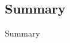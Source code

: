 \subsection{Summary}

\begin{frame}{Summary}
  \begin{statement}
    \substatement{}
  \end{statement}
\end{frame}

\chapterreferences
